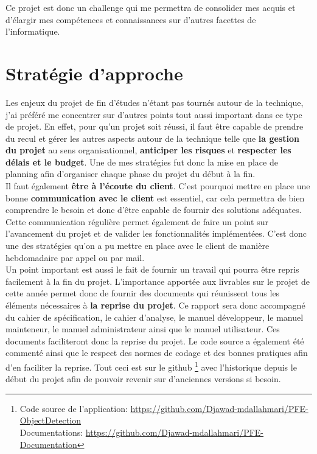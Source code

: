 \documentclass[UTF8]{EPURapport}
\begin{document}
Ce projet est donc un challenge qui me permettra de consolider mes acquis et d'élargir mes compétences et connaissances sur d'autres facettes de l'informatique.

\section{Stratégie d'approche}

Les enjeux du projet de fin d'études n'étant pas tournés autour de la technique, j'ai préféré me concentrer sur d'autres points tout aussi important dans ce type de projet. En effet, pour qu'un projet soit réussi, il faut être capable de prendre du recul et gérer les autres aspects autour de la technique telle que \textbf{la gestion du projet} au sens organisationnel, \textbf{anticiper les risques} et \textbf{respecter les délais et le budget}. Une de mes stratégies fut donc la mise en place de planning afin d'organiser chaque phase du projet du début à la fin.\\

Il faut également \textbf{être à l'écoute du client}. C'est pourquoi mettre en place une bonne \textbf{communication avec le client} est essentiel, car cela permettra de bien comprendre le besoin et donc d'être capable de fournir des solutions adéquates. Cette communication régulière permet également de faire un point sur l'avancement du projet et de valider les fonctionnalités implémentées. C'est donc une des stratégies qu'on a pu mettre en place avec le client de manière hebdomadaire par appel ou par mail.\\

Un point important est aussi le fait de fournir un travail qui pourra être repris facilement à la fin du projet. L'importance apportée aux livrables sur le projet de cette année permet donc de fournir des documents qui réunissent tous les éléments nécessaires à \textbf{la reprise du projet}. Ce rapport sera donc accompagné du cahier de spécification, le cahier d'analyse, le manuel développeur, le manuel mainteneur, le manuel administrateur ainsi que le manuel utilisateur. Ces documents faciliteront donc la reprise du projet. Le code source a également été commenté ainsi que le respect des normes de codage et des bonnes pratiques afin d'en faciliter la reprise. Tout ceci est sur le github \footnote{ Code source de l'application: \url{https://github.com/Djawad-mdallahmari/PFE-ObjectDetection} \\ Documentations: \url{https://github.com/Djawad-mdallahmari/PFE-Documentation}} avec l'historique depuis le début du projet afin de pouvoir revenir sur d'anciennes versions si besoin.
\end{document}
